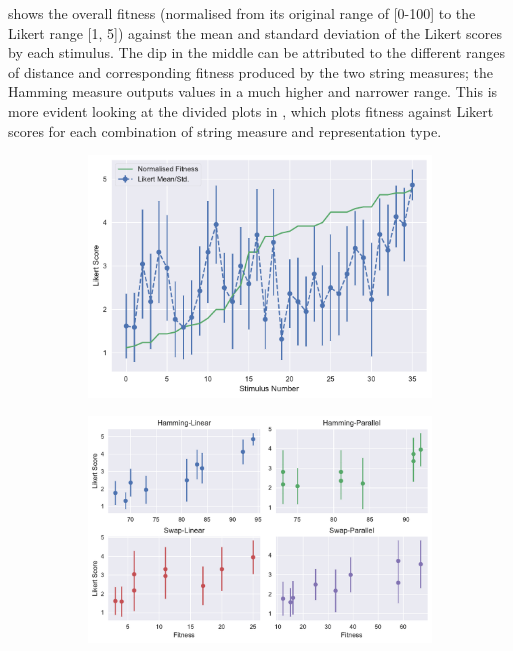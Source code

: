 { shows the overall fitness (normalised from its original range of [0-100] to the Likert range [1, 5]) against the mean and standard deviation of the Likert scores by each stimulus. The dip in the middle can be attributed to the different ranges of distance and corresponding fitness produced by the two string measures; the Hamming measure outputs values in a much higher and narrower range. This is more evident looking at the divided plots in  , which plots fitness against Likert scores for each combination of string measure and representation type. 

\begin{figure}
\centering
\begin{subfigure}[b]{0.75\textwidth}
   \includegraphics[width=1\linewidth]{ch03_symbolic/figures/total_likert.pdf}
   \caption{}
   \label{fig:like1} 
\end{subfigure}

\begin{subfigure}[b]{0.75\textwidth}
   \includegraphics[width=1\linewidth]{ch03_symbolic/figures/separate_likerts.pdf}
   \caption{}
   \label{fig:like2}
\end{subfigure}


\end{figure}}

